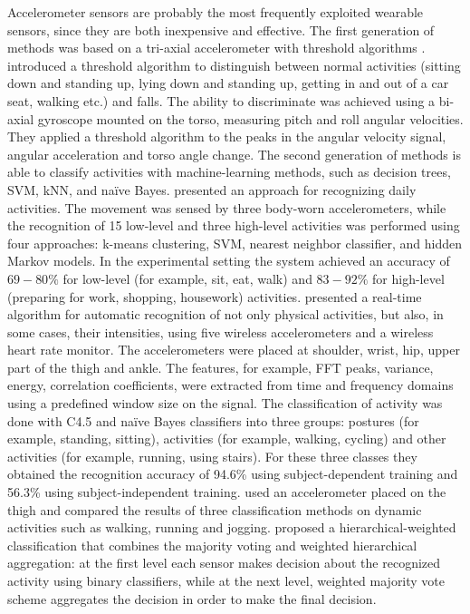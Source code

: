 Accelerometer sensors are probably the most frequently exploited wearable sensors, since they are both inexpensive and effective. The first generation of methods was based on a tri-axial accelerometer with threshold algorithms \citep{Kangas2008}. \cite{Bourke} introduced a threshold algorithm to distinguish between normal activities (sitting down and standing up, lying down and standing up, getting in and out of a car seat, walking etc.) and falls. The ability to discriminate was achieved using a bi-axial gyroscope mounted on the torso, measuring pitch and roll angular velocities. They applied a threshold algorithm to the peaks in the angular velocity signal, angular acceleration and torso angle change.
%
The second generation of methods is able to classify activities with machine-learning methods, such as decision trees, SVM, kNN, and na{\"i}ve Bayes. 
\cite{Hunyhn07scalable} presented an approach for recognizing daily activities. The movement was sensed by three body-worn accelerometers, while the recognition of 15 low-level and three high-level activities was performed using four approaches: k-means clustering, SVM, nearest neighbor classifier, and hidden Markov models. In the experimental setting the system achieved an accuracy of $69 - 80\%$ for low-level (for example, sit, eat, walk) and $83 - 92\%$ for high-level (preparing for work, shopping, housework) activities. 
%
\cite{Tapia2007} presented a real-time algorithm for automatic recognition of not only physical activities, but also, in some cases, their intensities, using five wireless accelerometers and a wireless heart rate monitor. The accelerometers were placed at shoulder, wrist, hip, upper part of the thigh and ankle. The features, for example, FFT peaks, variance, energy, correlation coefficients, were extracted from time and frequency domains using a predefined window size on the signal. The classification of activity was done with C4.5 and na{\"i}ve Bayes classifiers into three groups: postures (for example, standing, sitting), activities (for example, walking, cycling) and other activities (for example, running, using stairs). For these three classes they obtained the recognition accuracy of 94.6\% using subject-dependent training and 56.3\% using subject-independent training. 
%
\cite{Kwapisz2011} used an accelerometer placed on the thigh and compared the results of three classification methods on dynamic activities such as walking, running and jogging. 
%
\cite{Banos2013} proposed a hierarchical-weighted classification that combines the majority voting and weighted hierarchical aggregation: at the first level each sensor makes decision about the recognized activity using binary classifiers, while at the next level, weighted majority vote scheme aggregates the decision in order to make the final decision. 
 
